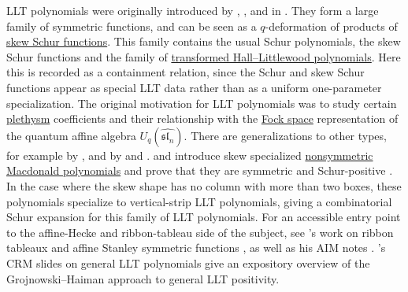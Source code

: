 LLT polynomials were originally introduced by ,
, and  in
\cite{Lascoux97ribbontableaux}.
They form a large family of symmetric functions, and can be seen as a
$q$-deformation of products of \hyperref[schurSkew]{skew Schur functions}.
This family contains the usual Schur polynomials, the skew Schur functions
and the family of \hyperref[hallLittlewoodT]{transformed Hall--Littlewood polynomials}.
Here this is recorded as a containment relation, since the Schur and skew
Schur functions appear as special LLT data rather than as a uniform
one-parameter specialization.
The original motivation for LLT polynomials was to study certain
\hyperref[plethysm]{plethysm} coefficients and their relationship with the
\hyperref[fockSpace]{Fock space} representation of the quantum affine algebra
$U_q(\widehat{\mathfrak{sl}_n})$.
There are generalizations to other types, for example by
 \cite{Lecouvey2009}, and by
 and  \cite{GrojnowskiHaiman2006}.
 and  introduce skew specialized
\hyperref[macdonaldE]{nonsymmetric Macdonald polynomials} and prove that
they are symmetric and Schur-positive \cite{AlexanderssonUhlin2020}.  In the
case where the skew shape has no column with more than two boxes, these
polynomials specialize to vertical-strip LLT polynomials, giving a
combinatorial Schur expansion for this family of LLT polynomials.
For an accessible entry point to the affine-Hecke and ribbon-tableau side of
the subject, see 's work on ribbon tableaux and affine
Stanley symmetric functions \cite{Lam2005,Lam2006}, as well as his AIM notes
\cite{Lam2005IntroLLT}.
's CRM slides on general LLT polynomials
\cite{Haiman2007GeneralLLTSlides} give an expository overview of the
Grojnowski--Haiman approach to general LLT positivity.


